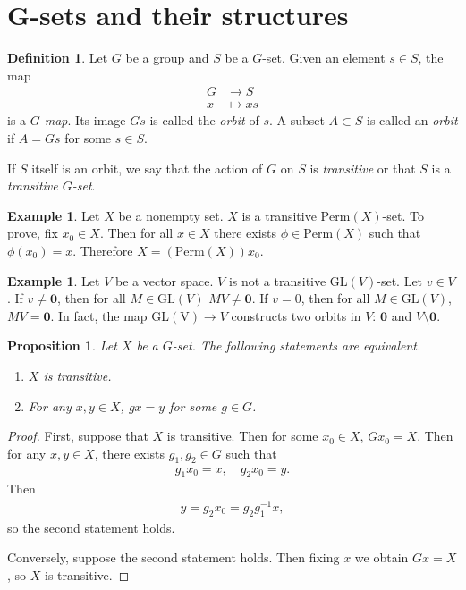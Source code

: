 \documentclass[12pt]{report}
\theoremstyle{plain}
\newtheorem{proposition}[theorem]{Proposition}
\theoremstyle{remark}
\theoremstyle{definition}
\newtheorem{definition}[theorem]{Definition}
\newtheorem{example}[theorem]{Example}
\begin{document}
\section{G-sets and their structures}
\begin{definition}
    Let $G$ be a group and $S$ be a $G$-set. Given an element $s\in S$, the map
    \begin{align*}
        G &\rightarrow S \\
        x &\mapsto xs
    \end{align*}
    is a \emph{$G$-map}. Its image $Gs$ is called the \emph{orbit} of $s$. A subset $A\subset S$ is called an \emph{orbit} if $A=Gs$ for some $s\in S$.

    If $S$ itself is an orbit, we say that the action of $G$ on $S$ is \emph{transitive} or that $S$ is a \emph{transitive $G$-set}.
\end{definition}

\begin{example}
    Let $X$ be a nonempty set. $X$ is a transitive $\mathrm{Perm}(X)$-set. To prove, fix $x_0\in X$. Then for all $x\in X$ there exists $\phi\in \mathrm{Perm}(X)$ such that $\phi(x_0) = x$. Therefore $X = (\mathrm{Perm}(X))x_0$.
\end{example}

\begin{example}
    Let $V$ be a vector space. $V$ is not a transitive $\mathrm{GL}(V)$-set. Let $v\in V$. If $v\neq \mathbf{0}$, then for all $M\in\mathrm{GL}(V)$ $MV\neq \mathbf{0}$. If $v=0$, then for all $M\in\mathrm{GL}(V)$, $MV=\mathbf{0}$. In fact, the map $\mathrm{GL(V)}\rightarrow V$ constructs two orbits in $V$: $\mathbf{0}$ and $V\setminus\mathbf{0}$.
\end{example}

\begin{proposition}
    Let $X$ be a $G$-set. The following statements are equivalent.
    \begin{enumerate}
        \item $X$ is transitive.
        \item For any $x,y\in X$, $gx=y$ for some $g\in G$.
    \end{enumerate}
\end{proposition}
\begin{proof}
    First, suppose that $X$ is transitive. Then for some $x_0\in X$, $Gx_0 = X$. Then for any $x,y\in X$, there exists $g_1, g_2\in G$ such that
    \begin{align*}
        g_1 x_0 = x,\quad g_2x_0 = y.
    \end{align*}
    Then
    \begin{align*}
        y = g_2x_0 = g_2g_1^{-1}x,
    \end{align*}
    so the second statement holds.

    Conversely, suppose the second statement holds. Then fixing $x$ we obtain $Gx=X$, so $X$ is transitive.
\end{proof}
\end{document}
